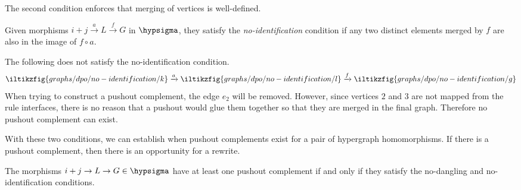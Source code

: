 The second condition enforces that merging of vertices is well-defined.

\begin{definition}
    Given morphisms \(i+j \xrightarrow{a} L \xrightarrow{f} G\) in
    \(\hypsigma\), they satisfy the \emph{no-identification} condition if any
    two distinct elements merged by \(f\) are also in the image of \(f \circ a\).
\end{definition}

\begin{example}
    The following does not satisfy the no-identification
    condition.
    \[
        \iltikzfig{graphs/dpo/no-identification/k}
        \xrightarrow{a}
        \iltikzfig{graphs/dpo/no-identification/l}
        \xrightarrow{f}
        \iltikzfig{graphs/dpo/no-identification/g}
    \]
    When trying to construct a pushout complement, the edge \(e_2\) will be
    removed.
    However, since vertices \(2\) and \(3\) are not mapped from the rule
    interfaces, there is no reason that a pushout would glue them together so
    that they are merged in the final graph.
    Therefore no pushout complement can exist.
    \begin{center}
    \end{center}
\end{example}

With these two conditions, we can establish when pushout complements exist for
a pair of hypergraph homomorphisms.
If there is a pushout complement, then there is an opportunity for a rewrite.

\begin{proposition}
    \label{prop:pushout-complement}
    The morphisms \(i+j \to L \to G \in \hypsigma\) have at least one pushout
    complement if and only if they satisfy the no-dangling and no-identification
    conditions.
\end{proposition}

